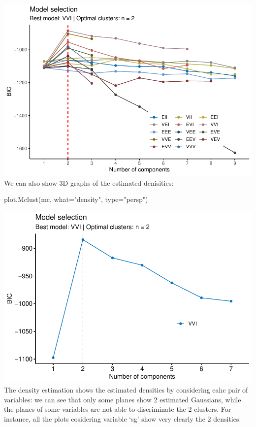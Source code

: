 \documentclass[
]{article}
\newenvironment{Shaded}{\begin{snugshade}}{\end{snugshade}}
\newcommand{\AttributeTok}[1]{\textcolor[rgb]{0.77,0.63,0.00}{#1}}
\newcommand{\FunctionTok}[1]{\textcolor[rgb]{0.00,0.00,0.00}{#1}}
\newcommand{\NormalTok}[1]{#1}
\newcommand{\StringTok}[1]{\textcolor[rgb]{0.31,0.60,0.02}{#1}}
\begin{document}
\includegraphics{clustering_files/figure-latex/unnamed-chunk-86-1.pdf}
We can also show 3D graphs of the estimated denisities:

\begin{Shaded}
\begin{Highlighting}[]
\FunctionTok{plot.Mclust}\NormalTok{(mc, }\AttributeTok{what=}\StringTok{"density"}\NormalTok{, }\AttributeTok{type=}\StringTok{"persp"}\NormalTok{)}
\end{Highlighting}
\end{Shaded}

\includegraphics{clustering_files/figure-latex/unnamed-chunk-87-1.pdf}
The density estimation shows the estimated densities by considering eahc
pair of variables: we can see that only some planes show 2 estimated
Gaussians, while the planes of some variables are not able to
discriminate the 2 clusters. For instance, all the plots cosidering
variable `sg' show very clearly the 2 densities.
\end{document}
